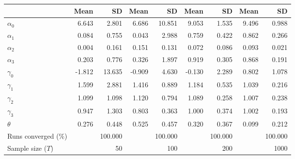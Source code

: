 
\begin{tabular}[t]{lrrrrrrrr}
\toprule
  & Mean & SD & Mean  & SD  & Mean   & SD   & Mean    & SD   \\
\midrule
$\alpha_{0}$ & 6.643 & 2.801 & 6.686 & 10.851 & 9.053 & 1.535 & 9.496 & 0.988\\
$\alpha_{1}$ & 0.084 & 0.755 & 0.043 & 2.988 & 0.759 & 0.422 & 0.862 & 0.266\\
$\alpha_{2}$ & 0.004 & 0.161 & 0.151 & 0.131 & 0.072 & 0.086 & 0.093 & 0.021\\
$\alpha_{3}$ & 0.203 & 0.776 & 0.326 & 1.897 & 0.919 & 0.305 & 0.868 & 0.191\\
$\gamma_{0}$ & -1.812 & 13.635 & -0.909 & 4.630 & -0.130 & 2.289 & 0.802 & 1.078\\
$\gamma_{1}$ & 1.599 & 2.881 & 1.416 & 0.889 & 1.184 & 0.535 & 1.039 & 0.216\\
$\gamma_{2}$ & 1.099 & 1.098 & 1.120 & 0.794 & 1.089 & 0.258 & 1.007 & 0.238\\
$\gamma_{3}$ & 0.947 & 1.303 & 0.803 & 0.363 & 1.000 & 0.374 & 1.002 & 0.193\\
$\theta$ & 0.276 & 0.448 & 0.525 & 0.457 & 0.320 & 0.367 & 0.099 & 0.212\\
Runs converged (\%) &  & 100.000 &  & 100.000 &  & 100.000 &  & 100.000\\
Sample size ($T$) &  & 50 &  & 100 &  & 200 &  & 1000\\
\bottomrule
\end{tabular}
